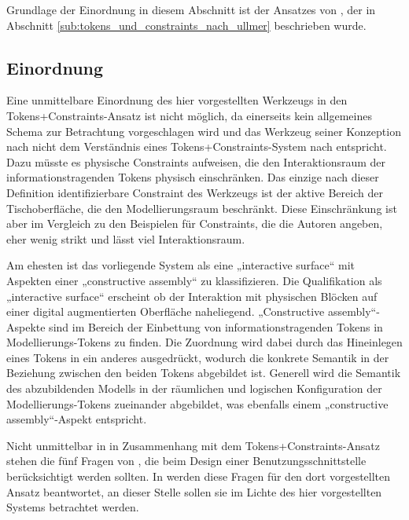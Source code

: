 Grundlage der Einordnung in diesem Abschnitt ist der Ansatzes von \citep{Ullmer05}, der in Abschnitt \ref{sub:tokens_und_constraints_nach_ullmer} beschrieben wurde.

\subsection{Einordnung}

Eine unmittelbare Einordnung des hier vorgestellten Werkzeugs in den Tokens+Constraints-Ansatz ist nicht möglich, da einerseits kein allgemeines Schema zur Betrachtung vorgeschlagen wird und das Werkzeug seiner Konzeption nach nicht dem Verständnis eines Tokens+Constraints-System nach \citep{Ullmer05} entspricht. Dazu müsste es physische Constraints aufweisen, die den Interaktionsraum der informationstragenden Tokens physisch einschränken. Das einzige nach dieser Definition identifizierbare Constraint des Werkzeugs ist der aktive Bereich der Tischoberfläche, die den Modellierungsraum beschränkt. Diese Einschränkung ist aber im Vergleich zu den Beispielen für Constraints, die die Autoren angeben, eher wenig strikt und lässt viel Interaktionsraum.

Am ehesten ist das vorliegende System als eine „interactive surface“ mit Aspekten einer „constructive assembly“ zu klassifizieren. Die Qualifikation als „interactive surface“ erscheint ob der Interaktion mit physischen Blöcken auf einer digital augmentierten Oberfläche naheliegend. „Constructive assembly“-Aspekte sind im Bereich der Einbettung von informationstragenden Tokens in Modellierungs-Tokens zu finden. Die Zuordnung wird dabei durch das Hineinlegen eines Tokens in ein anderes ausgedrückt, wodurch die konkrete Semantik in der Beziehung zwischen den beiden Tokens abgebildet ist. Generell wird die Semantik des abzubildenden Modells in der räumlichen und logischen Konfiguration der Modellierungs-Tokens zueinander abgebildet, was ebenfalls einem „constructive assembly“-Aspekt entspricht.

Nicht unmittelbar in in Zusammenhang mit dem Tokens+Constraints-Ansatz stehen die fünf Fragen von \citep{Bellotti02}, die beim Design einer Benutzungsschnittstelle berücksichtigt werden sollten. In \citet{Ullmer05} werden diese Fragen für den dort vorgestellten Ansatz beantwortet, an dieser Stelle sollen sie im Lichte des hier vorgestellten Systems betrachtet werden.

